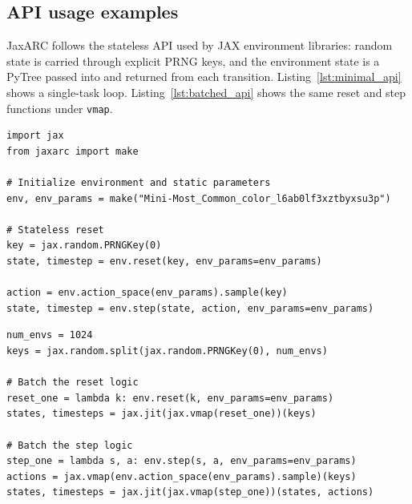 \begin{table}[htbp]
\centering
\caption{Working-grid initialization strategies. The agent is assigned one strategy per episode using the configured weights.}
\label{tab:grid_init}
\scriptsize
{}
\end{table}

\subsection{API usage examples}
\label{app:usage}

JaxARC follows the stateless API used by JAX environment libraries: random state is carried through explicit PRNG keys, and the environment state is a PyTree passed into and returned from each transition. Listing~\ref{lst:minimal_api} shows a single-task loop. Listing~\ref{lst:batched_api} shows the same reset and step functions under \texttt{vmap}.

\begin{lstlisting}[style=jaxarcpython, caption={Minimal transition loop for a single task.}, label={lst:minimal_api}]
import jax
from jaxarc import make

# Initialize environment and static parameters
env, env_params = make("Mini-Most_Common_color_l6ab0lf3xztbyxsu3p")

# Stateless reset
key = jax.random.PRNGKey(0)
state, timestep = env.reset(key, env_params=env_params)

action = env.action_space(env_params).sample(key)
state, timestep = env.step(state, action, env_params=env_params)
\end{lstlisting}

\begin{lstlisting}[style=jaxarcpython, caption={High-throughput vectorization using \texttt{vmap}.}, label={lst:batched_api}]
num_envs = 1024
keys = jax.random.split(jax.random.PRNGKey(0), num_envs)

# Batch the reset logic
reset_one = lambda k: env.reset(k, env_params=env_params)
states, timesteps = jax.jit(jax.vmap(reset_one))(keys)

# Batch the step logic
step_one = lambda s, a: env.step(s, a, env_params=env_params)
actions = jax.vmap(env.action_space(env_params).sample)(keys)
states, timesteps = jax.jit(jax.vmap(step_one))(states, actions)
\end{lstlisting}

